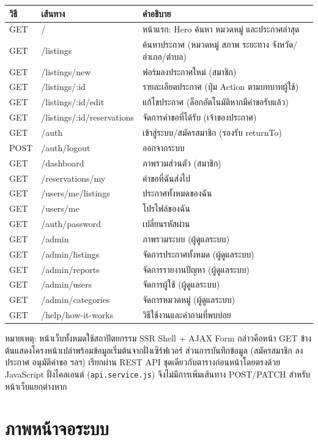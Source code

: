 \documentclass[12pt,a4paper]{report}
\begin{document}
\noindent\begin{tabularx}{\textwidth}{l l X}
\toprule
\textbf{วิธี} & \textbf{เส้นทาง} & \textbf{คำอธิบาย}\\
\midrule
GET & / & หน้าแรก: Hero ค้นหา หมวดหมู่ และประกาศล่าสุด\\
GET & /listings & ค้นหาประกาศ (หมวดหมู่ สภาพ ระยะทาง จังหวัด/อำเภอ/ตำบล)\\
GET & /listings/new & ฟอร์มลงประกาศใหม่ (สมาชิก)\\
GET & /listings/:id & รายละเอียดประกาศ (ปุ่ม Action ตามบทบาทผู้ใช้)\\
GET & /listings/:id/edit & แก้ไขประกาศ (ล็อกอัตโนมัติหากมีคำขอรับแล้ว)\\
GET & /listings/:id/reservations & จัดการคำขอที่ได้รับ (เจ้าของประกาศ)\\
GET & /auth & เข้าสู่ระบบ/สมัครสมาชิก (รองรับ returnTo)\\
POST & /auth/logout & ออกจากระบบ\\
GET & /dashboard & ภาพรวมส่วนตัว (สมาชิก)\\
GET & /reservations/my & คำขอที่ฉันส่งไป\\
GET & /users/me/listings & ประกาศทั้งหมดของฉัน\\
GET & /users/me & โปรไฟล์ของฉัน\\
GET & /auth/password & เปลี่ยนรหัสผ่าน\\
GET & /admin & ภาพรวมระบบ (ผู้ดูแลระบบ)\\
GET & /admin/listings & จัดการประกาศทั้งหมด (ผู้ดูแลระบบ)\\
GET & /admin/reports & จัดการรายงานปัญหา (ผู้ดูแลระบบ)\\
GET & /admin/users & จัดการผู้ใช้ (ผู้ดูแลระบบ)\\
GET & /admin/categories & จัดการหมวดหมู่ (ผู้ดูแลระบบ)\\
GET & /help/how-it-works & วิธีใช้งานและคำถามที่พบบ่อย\\
\bottomrule
\end{tabularx}

\noindent\footnotesize หมายเหตุ: หน้าเว็บทั้งหมดใช้สถาปัตยกรรม SSR Shell + AJAX Form กล่าวคือหน้า GET ข้างต้นแสดงโครงหน้าเปล่าพร้อมข้อมูลเริ่มต้นจากฝั่งเซิร์ฟเวอร์ ส่วนการบันทึกข้อมูล (สมัครสมาชิก ลงประกาศ อนุมัติคำขอ ฯลฯ) เรียกผ่าน REST API ชุดเดียวกับตารางก่อนหน้าโดยตรงด้วย JavaScript ฝั่งไคลเอนต์ (\texttt{api.service.js}) จึงไม่มีการเพิ่มเส้นทาง POST/PATCH สำหรับหน้าเว็บแยกต่างหาก

\chapter{ภาพหน้าจอระบบ}
\end{document}
